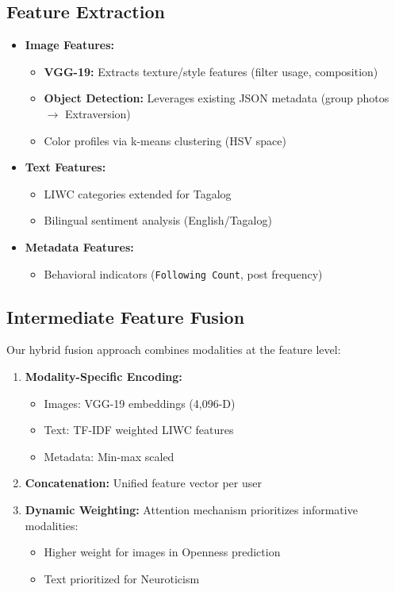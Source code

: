 \subsection{Feature Extraction}
\label{subsec:features}

\begin{itemize}
	\item \textbf{Image Features:}
	\begin{itemize}
		\item \textbf{VGG-19:} Extracts texture/style features (filter usage, composition)
		\item \textbf{Object Detection:} Leverages existing JSON metadata (group photos $\rightarrow$ Extraversion)
		\item Color profiles via k-means clustering (HSV space)
	\end{itemize}
	
	\item \textbf{Text Features:}
	\begin{itemize}
		\item LIWC categories extended for Tagalog
		\item Bilingual sentiment analysis (English/Tagalog)
	\end{itemize}
	
	\item \textbf{Metadata Features:}
	\begin{itemize}
		\item Behavioral indicators (\texttt{Following Count}, post frequency)
	\end{itemize}
\end{itemize}

\subsection{Intermediate Feature Fusion}
\label{subsec:fusion}

Our hybrid fusion approach combines modalities at the feature level:

\begin{enumerate}
	\item \textbf{Modality-Specific Encoding:}
	\begin{itemize}
		\item Images: VGG-19 embeddings (4,096-D)
		\item Text: TF-IDF weighted LIWC features
		\item Metadata: Min-max scaled
	\end{itemize}
	
	\item \textbf{Concatenation:} Unified feature vector per user
	
	\item \textbf{Dynamic Weighting:} Attention mechanism prioritizes informative modalities:
	\begin{itemize}
		\item Higher weight for images in Openness prediction
		\item Text prioritized for Neuroticism
	\end{itemize}
\end{enumerate}

